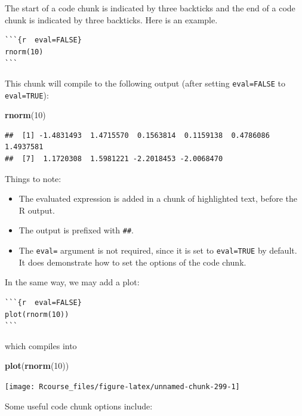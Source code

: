 \documentclass[]{book}
\newenvironment{Shaded}{\begin{snugshade}}{\end{snugshade}}
\newcommand{\DecValTok}[1]{\textcolor[rgb]{0.00,0.00,0.81}{#1}}
\newcommand{\KeywordTok}[1]{\textcolor[rgb]{0.13,0.29,0.53}{\textbf{#1}}}
\newcommand{\NormalTok}[1]{#1}
\providecommand{\tightlist}{%
  \setlength{\itemsep}{0pt}\setlength{\parskip}{0pt}}
\theoremstyle{definition}
\theoremstyle{definition}
\theoremstyle{definition}
\theoremstyle{remark}
\begin{document}
The start of a code chunk is indicated by three backticks and the end of a code chunk is indicated by three backticks.
Here is an example.

\begin{verbatim}
```{r  eval=FALSE}
rnorm(10)
```
\end{verbatim}

This chunk will compile to the following output (after setting \texttt{eval=FALSE} to \texttt{eval=TRUE}):

\begin{Shaded}
\begin{Highlighting}[]
\KeywordTok{rnorm}\NormalTok{(}\DecValTok{10}\NormalTok{)}
\end{Highlighting}
\end{Shaded}

\begin{verbatim}
##  [1] -1.4831493  1.4715570  0.1563814  0.1159138  0.4786086  1.4937581
##  [7]  1.1720308  1.5981221 -2.2018453 -2.0068470
\end{verbatim}

Things to note:

\begin{itemize}
\tightlist
\item
  The evaluated expression is added in a chunk of highlighted text, before the R output.
\item
  The output is prefixed with \texttt{\#\#}.
\item
  The \texttt{eval=} argument is not required, since it is set to \texttt{eval=TRUE} by default. It does demonstrate how to set the options of the code chunk.
\end{itemize}

In the same way, we may add a plot:

\begin{verbatim}
```{r  eval=FALSE}
plot(rnorm(10))
```
\end{verbatim}

which compiles into

\begin{Shaded}
\begin{Highlighting}[]
\KeywordTok{plot}\NormalTok{(}\KeywordTok{rnorm}\NormalTok{(}\DecValTok{10}\NormalTok{))}
\end{Highlighting}
\end{Shaded}

\texttt{[image: Rcourse\_files/figure-latex/unnamed-chunk-299-1]}

Some useful code chunk options include:
\end{document}
